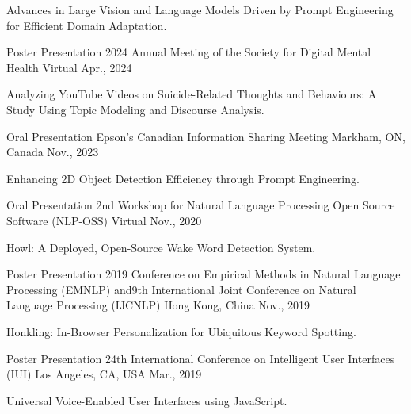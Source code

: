 \begin{cventries}
{\begin{cvitems}
\item {Advances in Large Vision and Language Models Driven by Prompt Engineering for Efficient Domain Adaptation.}
\end{cvitems}
}
\cventry
{Poster Presentation} %
{2024 Annual Meeting of the Society for Digital Mental Health} %
{Virtual} %
{Apr., 2024} %
{ %
\begin{cvitems}
\item {Analyzing YouTube Videos on Suicide-Related Thoughts and Behaviours: A Study Using Topic Modeling and Discourse Analysis.}
\end{cvitems}
}
\cventry
{Oral Presentation} %
{Epson's Canadian Information Sharing Meeting} %
{Markham, ON, Canada} %
{Nov., 2023} %
{ %
\begin{cvitems}
\item {Enhancing 2D Object Detection Efficiency through Prompt Engineering.}
\end{cvitems}
}
\cventry
{Oral Presentation} %
{2nd Workshop for Natural Language Processing Open Source Software (NLP-OSS)} %
{Virtual} %
{Nov., 2020} %
{ %
\begin{cvitems}
\item {Howl: A Deployed, Open-Source Wake Word Detection System.}
\end{cvitems}
}
\cventry
{Poster Presentation} %
{2019 Conference on Empirical Methods in Natural Language Processing (EMNLP) and\newline 9th International Joint Conference on Natural Language Processing (IJCNLP)} %
{Hong Kong, China} %
{Nov., 2019} %
{ %
\begin{cvitems}
\item {Honkling: In-Browser Personalization for Ubiquitous Keyword Spotting.}
\end{cvitems}
}
\cventry
{Poster Presentation} %
{24th International Conference on Intelligent User Interfaces (IUI)} %
{Los Angeles, CA, USA} %
{Mar., 2019} %
{ %
\begin{cvitems}
\item {Universal Voice-Enabled User Interfaces using JavaScript.}
\end{cvitems}
}
\end{cventries}

